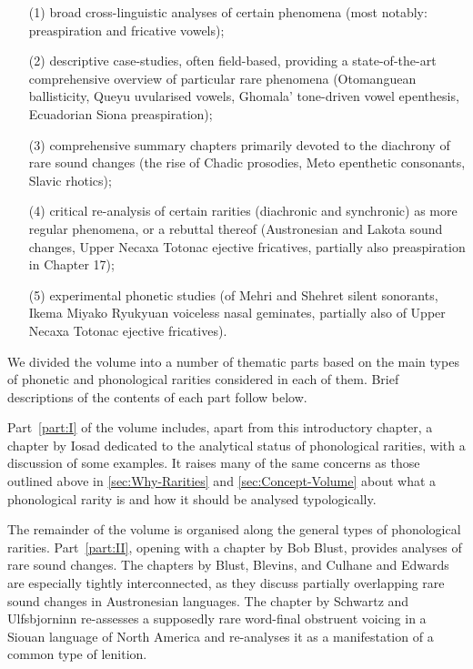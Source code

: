 \documentclass[output=paper]{langscibook}
\begin{document}
\begin{itemize}
\sloppy
\item[(1)]
    \label{ex:anderson:1}
         broad cross-linguistic analyses of certain phenomena (most notably: preaspiration and fricative vowels);

\item[(2)]
    \label{ex:anderson:2}
         descriptive case-studies, often field-based, providing a state-of-the-art comprehensive overview of particular rare phenomena (Otomanguean ballisticity, Queyu uvularised vowels, Ghomala’ tone-driven vowel epenthesis, Ecuadorian Siona preaspiration);

\item[(3)]
    \label{ex:anderson:3}
         comprehensive summary chapters primarily devoted to the diachrony of rare sound changes (the rise of Chadic prosodies, Meto epenthetic consonants, Slavic rhotics);

\item[(4)]
    \label{ex:anderson:4}
         critical re-analysis of certain rarities (diachronic and synchronic) as more regular phenomena, or a rebuttal thereof (Austronesian and Lakota sound changes, Upper Necaxa Totonac ejective fricatives, partially also preaspiration in Chapter 17);

\item[(5)]
    \label{ex:anderson:5}
         experimental phonetic studies (of Mehri and Shehret silent sonorants, Ikema Miyako Ryukyuan voiceless nasal geminates, partially also of Upper Necaxa Totonac ejective fricatives).
\end{itemize}

We divided the volume into a number of thematic parts based on the main types of phonetic and phonological rarities considered in each of them. Brief descriptions of the contents of each part follow below.

Part~\ref{part:I} of the volume includes, apart from this introductory chapter, a chapter by Iosad dedicated to the analytical status of phonological rarities, with a discussion of some examples. It raises many of the same concerns as those outlined above in \cref{sec:Why-Rarities} and \cref{sec:Concept-Volume} about what a phonological rarity is and how it should be analysed typologically.

The remainder of the volume is organised along the general types of phonological rarities. Part~\ref{part:II}, opening with a chapter by Bob Blust, provides analyses of rare sound changes. The chapters by Blust, Blevins, and Culhane and Edwards are especially tightly interconnected, as they discuss partially overlapping rare sound changes in Austronesian languages. The chapter by Schwartz and Ulfsbjorninn re-assesses a supposedly rare word-final obstruent voicing in a Siouan language of North America and re-analyses it as a manifestation of a common type of lenition.
\end{document}
